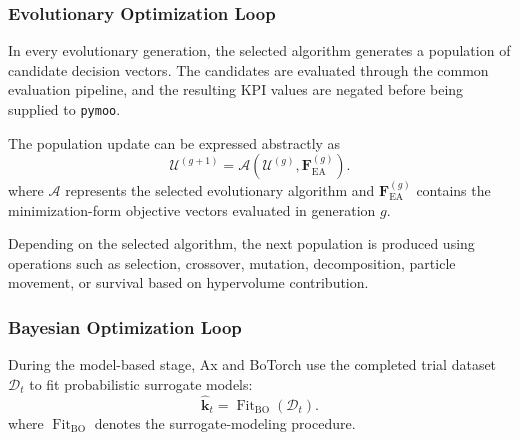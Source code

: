 \subsubsection{Evolutionary Optimization Loop}

In every evolutionary generation, the selected algorithm generates a population of candidate
decision vectors. The candidates are evaluated through the common evaluation pipeline, and the
resulting KPI values are negated before being supplied to \texttt{pymoo}.

The population update can be expressed abstractly as
\begin{equation}
    \mathcal{U}^{(g+1)}
    =
    \mathcal{A}
    \left(
        \mathcal{U}^{(g)},
        \mathbf{F}_{\mathrm{EA}}^{(g)}
    \right).
\end{equation}
where $\mathcal{A}$ represents the selected evolutionary algorithm and
$\mathbf{F}_{\mathrm{EA}}^{(g)}$ contains the minimization-form objective vectors evaluated in
generation $g$. 

Depending on the selected algorithm, the next population is produced using operations such as
selection, crossover, mutation, decomposition, particle movement, or survival based on hypervolume
contribution.

\subsubsection{Bayesian Optimization Loop}

During the model-based stage, Ax and BoTorch use the completed trial dataset $\mathcal{D}_t$ to fit
probabilistic surrogate models:
\begin{equation}
    \widehat{\mathbf{k}}_t
    =
    \operatorname{Fit}_{\mathrm{BO}}(\mathcal{D}_t).
\end{equation}
where $\operatorname{Fit}_{\mathrm{BO}}$ denotes the surrogate-modeling procedure. 

